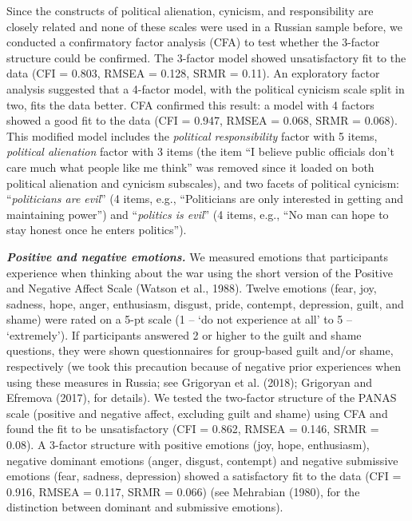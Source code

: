 \documentclass[
]{article}
\begin{document}
Since the constructs of political alienation, cynicism, and responsibility are closely related and none of these scales were used in a Russian sample before, we conducted a confirmatory factor analysis (CFA) to test whether the 3-factor structure could be confirmed. The 3-factor model showed unsatisfactory fit to the data (CFI = 0.803, RMSEA = 0.128, SRMR = 0.11). An exploratory factor analysis suggested that a 4-factor model, with the political cynicism scale split in two, fits the data better. CFA confirmed this result: a model with 4 factors showed a good fit to the data (CFI = 0.947, RMSEA = 0.068, SRMR = 0.068). This modified model includes the \emph{political responsibility} factor with 5 items, \emph{political alienation} factor with 3 items (the item ``I believe public officials don't care much what people like me think'' was removed since it loaded on both political alienation and cynicism subscales), and two facets of political cynicism: ``\emph{politicians are evil}'' (4 items, e.g., ``Politicians are only interested in getting and maintaining power'') and ``\emph{politics is evil}'' (4 items, e.g., ``No man can hope to stay honest once he enters politics'').

\textbf{\emph{Positive and negative emotions.}} We measured emotions that participants experience when thinking about the war using the short version of the Positive and Negative Affect Scale (Watson et al., 1988). Twelve emotions (fear, joy, sadness, hope, anger, enthusiasm, disgust, pride, contempt, depression, guilt, and shame) were rated on a 5-pt scale (1 -- `do not experience at all' to 5 -- `extremely'). If participants answered 2 or higher to the guilt and shame questions, they were shown questionnaires for group-based guilt and/or shame, respectively (we took this precaution because of negative prior experiences when using these measures in Russia; see Grigoryan et al. (2018); Grigoryan and Efremova (2017), for details). We tested the two-factor structure of the PANAS scale (positive and negative affect, excluding guilt and shame) using CFA and found the fit to be unsatisfactory (CFI = 0.862, RMSEA = 0.146, SRMR = 0.08). A 3-factor structure with positive emotions (joy, hope, enthusiasm), negative dominant emotions (anger, disgust, contempt) and negative submissive emotions (fear, sadness, depression) showed a satisfactory fit to the data (CFI = 0.916, RMSEA = 0.117, SRMR = 0.066) (see Mehrabian (1980), for the distinction between dominant and submissive emotions).
\end{document}
